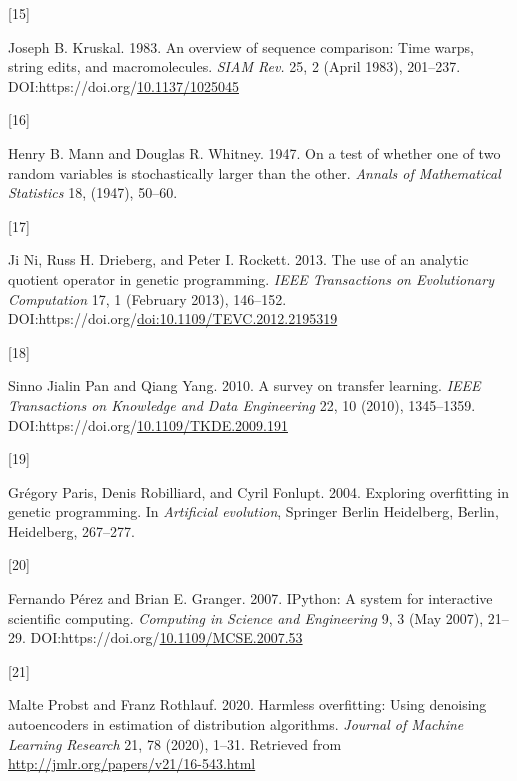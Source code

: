 \documentclass[
  11pt,
]{article}
\newlength{\cslhangindent}
\newlength{\csllabelwidth}
\newlength{\cslentryspacingunit} %
\newenvironment{CSLReferences}[2] %
 {%
  \setlength{\parindent}{0pt}
  \ifodd #1
  \let\oldpar\par
  \def\par{\hangindent=\cslhangindent\oldpar}
  \fi
  \setlength{\parskip}{#2\cslentryspacingunit}
 }%
 {}
\newcommand{\CSLLeftMargin}[1]{\parbox[t]{\csllabelwidth}{#1}}
\newcommand{\CSLRightInline}[1]{\parbox[t]{\linewidth - \csllabelwidth}{#1}\break}
\begin{document}
\begin{CSLReferences}{0}{0}
\leavevmode{}%
\CSLLeftMargin{{[}15{]} }%
\CSLRightInline{Joseph B. Kruskal. 1983. An overview of sequence comparison: Time warps, string edits, and macromolecules. \emph{SIAM Rev.} 25, 2 (April 1983), 201--237. DOI:https://doi.org/\href{https://doi.org/10.1137/1025045}{10.1137/1025045}}

\leavevmode{}%
\CSLLeftMargin{{[}16{]} }%
\CSLRightInline{Henry B. Mann and Douglas R. Whitney. 1947. On a test of whether one of two random variables is stochastically larger than the other. \emph{Annals of Mathematical Statistics} 18, (1947), 50--60.}

\leavevmode{}%
\CSLLeftMargin{{[}17{]} }%
\CSLRightInline{Ji Ni, Russ H. Drieberg, and Peter I. Rockett. 2013. The use of an analytic quotient operator in genetic programming. \emph{IEEE Transactions on Evolutionary Computation} 17, 1 (February 2013), 146--152. DOI:https://doi.org/\href{https://doi.org/doi:10.1109/TEVC.2012.2195319}{doi:10.1109/TEVC.2012.2195319}}

\leavevmode{}%
\CSLLeftMargin{{[}18{]} }%
\CSLRightInline{Sinno Jialin Pan and Qiang Yang. 2010. A survey on transfer learning. \emph{IEEE Transactions on Knowledge and Data Engineering} 22, 10 (2010), 1345--1359. DOI:https://doi.org/\href{https://doi.org/10.1109/TKDE.2009.191}{10.1109/TKDE.2009.191}}

\leavevmode{}%
\CSLLeftMargin{{[}19{]} }%
\CSLRightInline{Grégory Paris, Denis Robilliard, and Cyril Fonlupt. 2004. Exploring overfitting in genetic programming. In \emph{Artificial evolution}, Springer Berlin Heidelberg, Berlin, Heidelberg, 267--277.}

\leavevmode{}%
\CSLLeftMargin{{[}20{]} }%
\CSLRightInline{Fernando Pérez and Brian E. Granger. 2007. {IP}ython: A system for interactive scientific computing. \emph{Computing in Science and Engineering} 9, 3 (May 2007), 21--29. DOI:https://doi.org/\href{https://doi.org/10.1109/MCSE.2007.53}{10.1109/MCSE.2007.53}}

\leavevmode{}%
\CSLLeftMargin{{[}21{]} }%
\CSLRightInline{Malte Probst and Franz Rothlauf. 2020. Harmless overfitting: Using denoising autoencoders in estimation of distribution algorithms. \emph{Journal of Machine Learning Research} 21, 78 (2020), 1--31. Retrieved from \url{http://jmlr.org/papers/v21/16-543.html}}


\end{CSLReferences}
\end{document}
